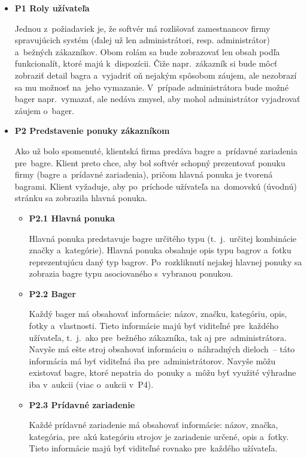 \begin{itemize}
\item \textbf{P1 Roly užívateľa}

Jednou z~požiadaviek je, že softvér má rozlišovať zamestnancov firmy spravujúcich systém (ďalej už len administrátori, resp. administrátor) a~bežných zákazníkov. Obom rolám sa bude zobrazovať len obsah podľa funkcionalít, ktoré majú k~dispozícii. Čiže napr.~zákazník si bude môcť zobraziť detail bagra a~vyjadriť oň nejakým spôsobom záujem, ale nezobrazí sa mu možnosť na~jeho vymazanie. V~prípade administrátora bude možné bager napr.~vymazať, ale nedáva zmysel, aby mohol administrátor vyjadrovať záujem o~bager.

\item \textbf{P2 Predstavenie ponuky zákazníkom}

Ako už bolo spomenuté, klientská firma predáva bagre a~prídavné zariadenia pre~bagre. Klient preto chce, aby bol softvér schopný prezentovať ponuku firmy (bagre a~prídavné zariadenia), pričom hlavná ponuka je tvorená bagrami. Klient vyžaduje, aby po~príchode užívateľa na~domovskú (úvodnú) stránku sa zobrazila hlavná ponuka.

\begin{itemize}
\item \textbf{P2.1 Hlavná ponuka}

Hlavná ponuka predstavuje bagre určitého typu (t.~j.~určitej kombinácie značky a~kategórie). Hlavná ponuka obsahuje opis typu bagrov a~fotku reprezentujúcu daný typ bagrov. Po~rozkliknutí nejakej hlavnej ponuky sa zobrazia bagre typu asociovaného s~vybranou ponukou.

\item \textbf{P2.2 Bager}

Každý bager má obsahovať informácie: názov, značku, kategóriu, opis, fotky a~vlastnosti. Tieto informácie majú byť viditeľné pre~každého užívateľa, t.~j.~ako pre~bežného zákazníka, tak aj pre~administrátora. Navyše má ešte stroj obsahovať informáciu o~náhradných dieloch~-- táto informácia má byť viditeľná iba pre~administrátorov. Navyše môžu existovať bagre, ktoré nepatria do~ponuky a~môžu byť využité výhradne iba v~aukcii (viac o~aukcii v~P4).

\item \textbf{P2.3 Prídavné zariadenie}

Každé prídavné zariadenie má obsahovať informácie: názov, značka, kategória, pre~akú kategóriu strojov je zariadenie určené, opis a~fotky. Tieto informácie majú byť viditeľné rovnako pre~každého užívateľa.


\end{itemize}
\end{itemize}
